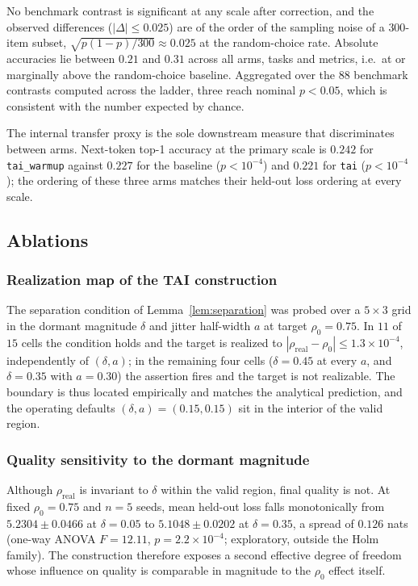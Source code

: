 \documentclass[final,5p,times,twocolumn]{elsarticle}
\theoremstyle{remark}
\newcommand{\rhoz}{\rho_{0}}
\begin{document}
No benchmark contrast is significant at any scale after correction, and the
observed differences ($|\Delta| \leq 0.025$) are of the order of the sampling
noise of a $300$-item subset, $\sqrt{p(1-p)/300} \approx 0.025$ at the
random-choice rate. Absolute
accuracies lie between $0.21$ and $0.31$ across all arms, tasks and metrics,
i.e.\ at or marginally above the random-choice baseline. Aggregated over the
$88$ benchmark contrasts computed across the ladder, three reach nominal
$p < 0.05$, which is consistent with the number expected by chance.

The internal transfer proxy is the sole downstream measure that discriminates
between arms. Next-token top-1 accuracy at the primary scale is $0.242$ for
\texttt{tai\_warmup} against $0.227$ for the baseline
($p < 10^{-4}$) and $0.221$ for \texttt{tai} ($p < 10^{-4}$); the ordering of
these three arms matches their held-out loss ordering at every scale.

\subsection{Ablations}
\label{sec:res-ablations}

\subsubsection{Realization map of the TAI construction}

The separation condition of Lemma~\ref{lem:separation} was probed over a
$5 \times 3$ grid in the dormant magnitude $\delta$ and jitter half-width $a$
at target $\rhoz = 0.75$. In $11$ of $15$ cells the condition holds and the
target is realized to $|\rho_{\mathrm{real}} - \rhoz| \leq 1.3\times 10^{-4}$,
independently of $(\delta, a)$; in the remaining four cells
($\delta = 0.45$ at every $a$, and $\delta = 0.35$ with $a = 0.30$) the
assertion fires and the target is not realizable. The boundary is thus located
empirically and matches the analytical prediction, and the operating defaults
$(\delta, a) = (0.15, 0.15)$ sit in the interior of the valid region.

\subsubsection{Quality sensitivity to the dormant magnitude}

Although $\rho_{\mathrm{real}}$ is invariant to $\delta$ within the valid
region, final quality is not. At fixed $\rhoz = 0.75$ and $n = 5$ seeds, mean
held-out loss falls monotonically from $5.2304 \pm 0.0466$ at $\delta = 0.05$
to $5.1048 \pm 0.0202$ at $\delta = 0.35$, a spread of $0.126$ nats
(one-way ANOVA $F = 12.11$, $p = 2.2\times 10^{-4}$; exploratory, outside the
Holm family). The construction therefore exposes a second effective degree of
freedom whose influence on quality is comparable in magnitude to the
$\rhoz$ effect itself.
\end{document}

